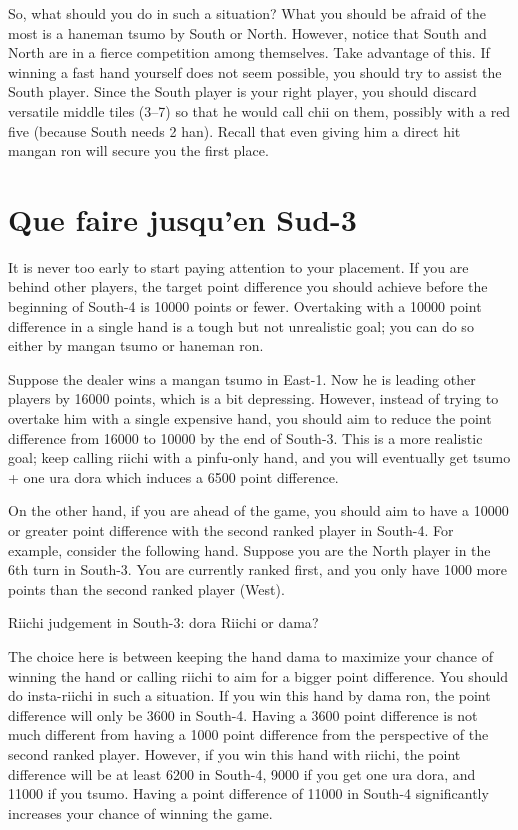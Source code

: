 \bigskip
So, what should you do in such a situation? 
What you should be afraid of the most is a {\jap haneman tsumo} by South or North. However, notice that South and North are in a fierce competition among themselves. Take advantage of this. If winning a fast hand yourself does not seem possible, you should try to assist the South player. Since the South player is your right player, you should discard versatile middle tiles (3--7) so that he would call {\jap chii} on them, possibly with a red five (because South needs 2 {\jap han}). Recall that even giving him a direct hit {\jap mangan ron} will secure you the first place. 

\section{Que faire jusqu'en Sud-3}
It is never too early to start paying attention to your placement. If you are behind other players, the target point difference you should achieve before the beginning of South-4 is 10000 points or fewer. Overtaking with a 10000 point difference in a single hand is a tough but not unrealistic goal; you can do so either by {\jap mangan tsumo} or {\jap haneman ron}. 

\bigskip
Suppose the dealer wins a {\jap mangan tsumo} in East-1. Now he is leading other players by 16000 points, which is a bit depressing. However, instead of trying to overtake him with a single expensive hand, you should aim to reduce the point difference from 16000 to 10000 by the end of South-3. This is a more realistic goal; keep calling riichi with a {\jap pinfu}-only hand, and you will eventually get {\jap tsumo} + one {\jap ura dora} which induces a 6500 point difference. 

\bigskip
On the other hand, if you are ahead of the game, you should aim to have a 10000 or greater point difference with the second ranked player in South-4. 
For example, consider the following hand. Suppose you are the North player in the 6th turn in South-3. You are currently ranked first, and you only have 1000 more points than the second ranked player (West). 

\bigskip
\begin{itembox}[r]{{\jap Riichi} judgement in South-3: {\jap dora} {\LARGE{}}}
\bp
{}\bei
\ep
\vspace{-10pt}
{\jap Riichi} or {\jap dama}?
\end{itembox}
\noindent The choice here is between keeping the hand {\jap dama} to maximize your chance of winning the hand or calling riichi to aim for a bigger point difference. 
You should do insta-riichi in such a situation. If you win this hand by {\jap dama ron}, the point difference will only be 3600 in South-4. Having a 3600 point difference is not much different from having a 1000 point difference from the perspective of the second ranked player. However, if you win this hand with riichi, the point difference will be at least 6200 in South-4, 9000 if you get one {\jap ura dora}, and 11000 if you {\jap tsumo}. Having a point difference of 11000 in South-4 significantly increases your chance of winning the game. 

